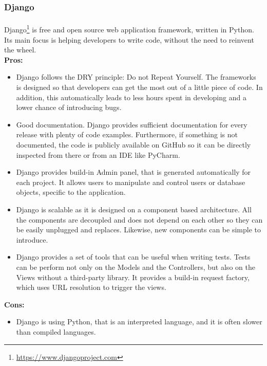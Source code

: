 \documentclass{l4proj}
\begin{document}
\subsubsection{Django}
\paragraph{}
Django\footnote{\url{https://www.djangoproject.com}} is free and open source web application framework, written in Python. Its main focus is helping developers to write code, without the need to reinvent the wheel.
\\ \textbf{Pros:}
\begin{itemize}
	\item Django follows the DRY principle: Do not Repeat Yourself. The frameworks is designed so that developers can get the most out of a little piece of code. In addition, this automatically leads to less hours spent in developing and a lower chance of introducing bugs.
	\item Good documentation. Django provides sufficient documentation for every release with plenty of code examples. Furthermore, if something is not documented, the code is publicly available on GitHub so 
	it can be directly inspected from there or from an IDE like PyCharm. 
	\item Django provides build-in Admin panel, that is generated automatically for each project. It allows users to manipulate and control users or database objects, specific to the application.
	\item Django is scalable as it is designed on a component based architecture. All the components are decoupled and does not depend on each other so they can be easily unplugged and replaces. Likewise, new components can be simple to introduce. 
	\item Django provides a set of tools that can be useful when writing tests. Tests can be perform not only on the Models and the Controllers, but also on the Views without a third-party library. It provides a build-in request factory, which uses URL resolution to trigger the views. 
\end{itemize}
\textbf{Cons:}
\begin{itemize}
	\item Django is using Python, that is an interpreted language, and it is often slower than compiled languages.  
\end{itemize}
\end{document}
